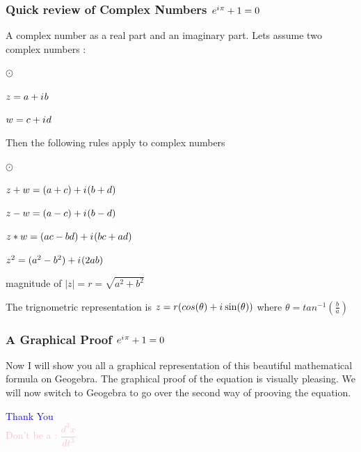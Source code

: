 \documentclass[10pt]{beamer}
\newcommand{\iu}{{i\mkern1mu}}
\begin{document}
\begin{frame}
	\frametitle{Quick review of Complex Numbers \hspace{25pt} \textcolor{pink}{\Huge\(e^{\iu \pi} +1 = 0\)}}
	A complex number as a real part and an imaginary part.  Lets assume two complex numbers :
	\begin{list}{$\odot$}{}
		\item  $z = a+\iu b$
		\item  $w = c+\iu d$
	\end{list}
Then the following rules apply to complex numbers
	\begin{list}{$\odot$}{}
		\item $ z+w = (a+c) + \iu(b+d) $\\
		
		\item $ z-w = (a-c) + \iu(b-d) $ \\
		
		\item $ z*w = (ac-bd) +\iu(bc+ad)$
		
		\item $z^2 = (a^2-b^2) +\iu(2ab)$ \\
		
		\item magnitude of $|z| = r = \sqrt{a^2 +b^2}$ 
		
		\item The trignometric representation is $z = r(cos(\theta)+\iu\sin(\theta))$ where $\theta = tan^{-1}(\frac{b}{a})$
		
	\end{list}
\end{frame}

\begin{frame}
	\frametitle{A Graphical Proof \hspace{25pt} \textcolor{pink}{\Huge\(e^{\iu \pi} +1  = 0\)}}
	Now I will show you all a graphical representation of this beautiful mathematical formula on Geogebra. The graphical proof of the equation is visually pleasing. We will now switch to Geogebra to go over the second way of prooving the equation.
\end{frame}


\begin{frame}
	\begin{center}
		\Huge \textcolor{blue}{Thank You} \\
		\vspace{25pt}
		\huge \textcolor{pink}{Don't be a : ${\dfrac{d^3x}{dt^3}}$}
	\end{center}
\end{frame}
\end{document}
